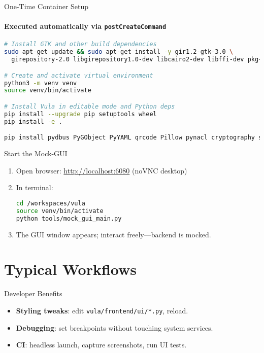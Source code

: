 \documentclass[
  ngerman,          %
  authorontitle=true,
]{bfhbeamer}
\begin{document}
\begin{frame}[fragile]{One-Time Container Setup}
  \framesubtitle{Executed automatically via \texttt{postCreateCommand}}
\begin{lstlisting}[language=bash]
# Install GTK and other build dependencies
sudo apt-get update && sudo apt-get install -y gir1.2-gtk-3.0 \
  girepository-2.0 libgirepository1.0-dev libcairo2-dev libffi-dev pkg-config

# Create and activate virtual environment
python3 -m venv venv
source venv/bin/activate

# Install Vula in editable mode and Python deps
pip install --upgrade pip setuptools wheel
pip install -e .

pip install pydbus PyGObject PyYAML qrcode Pillow pynacl cryptography schema click
\end{lstlisting}
\end{frame}

\begin{frame}[fragile]{Start the Mock-GUI}
\begin{enumerate}
  \item Open browser: \url{http://localhost:6080} (noVNC desktop)
  \item In terminal:
\begin{lstlisting}[language=bash]
cd /workspaces/vula
source venv/bin/activate
python tools/mock_gui_main.py
\end{lstlisting}
  \item The GUI window appears; interact freely—backend is mocked.
\end{enumerate}
\end{frame}

\section{Typical Workflows}

\begin{frame}{Developer Benefits}
  \begin{itemize}
    \item \textbf{Styling tweaks}: edit \texttt{vula/frontend/ui/*.py}, reload.
    \item \textbf{Debugging}: set breakpoints without touching system services.
    \item \textbf{CI}: headless launch, capture screenshots, run UI tests.
  \end{itemize}
\end{frame}
\end{document}
